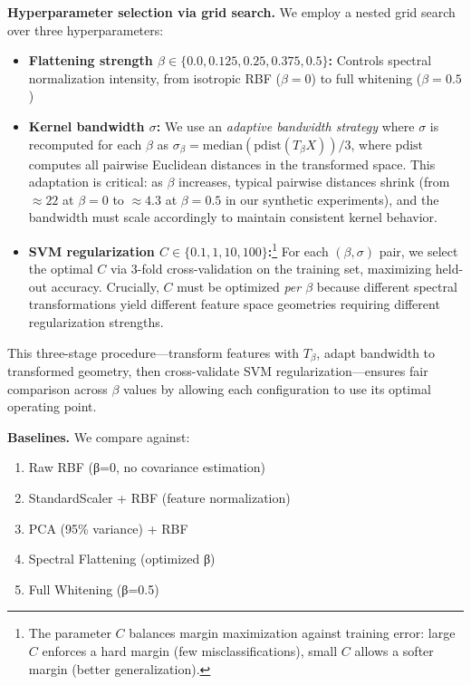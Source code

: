\documentclass[11pt]{article}
\begin{document}
\textbf{Hyperparameter selection via grid search.} We employ a nested grid search over three hyperparameters:
\begin{itemize}
    \item \textbf{Flattening strength $\beta \in \{0.0, 0.125, 0.25, 0.375, 0.5\}$:} Controls spectral normalization intensity, from isotropic RBF ($\beta=0$) to full whitening ($\beta=0.5$)
    
    \item \textbf{Kernel bandwidth $\sigma$:} We use an \emph{adaptive bandwidth strategy} where $\sigma$ is recomputed for each $\beta$ as $\sigma_\beta = \text{median}(\text{pdist}(T_\beta X)) / 3$, where $\text{pdist}$ computes all pairwise Euclidean distances in the transformed space. This adaptation is critical: as $\beta$ increases, typical pairwise distances shrink (from $\approx 22$ at $\beta=0$ to $\approx 4.3$ at $\beta=0.5$ in our synthetic experiments), and the bandwidth must scale accordingly to maintain consistent kernel behavior.
    
    \item \textbf{SVM regularization $C \in \{0.1, 1, 10, 100\}$:}\footnote{The parameter $C$ balances margin maximization against training error: large $C$ enforces a hard margin (few misclassifications), small $C$ allows a softer margin (better generalization).} For each $(\beta, \sigma)$ pair, we select the optimal $C$ via 3-fold cross-validation on the training set, maximizing held-out accuracy. Crucially, $C$ must be optimized \emph{per $\beta$} because different spectral transformations yield different feature space geometries requiring different regularization strengths.
\end{itemize}

This three-stage procedure---transform features with $T_\beta$, adapt bandwidth to transformed geometry, then cross-validate SVM regularization---ensures fair comparison across $\beta$ values by allowing each configuration to use its optimal operating point.

\textbf{Baselines.} We compare against:
\begin{enumerate}
    \item Raw RBF (β=0, no covariance estimation)
    \item StandardScaler + RBF (feature normalization)
    \item PCA (95\% variance) + RBF
    \item Spectral Flattening (optimized β)
    \item Full Whitening (β=0.5)
\end{enumerate}
\end{document}
